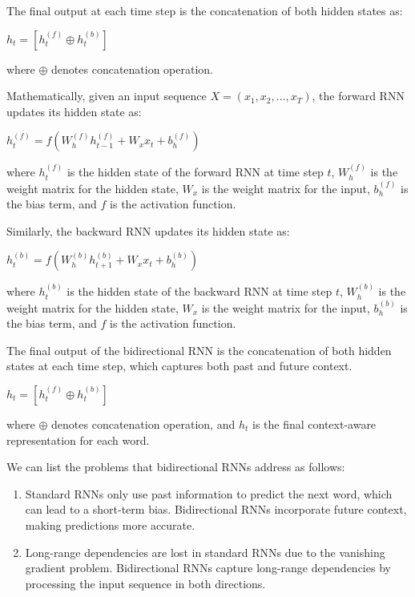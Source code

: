 \documentclass[10pt]{article}
\begin{document}
\begin{description}
The final output at each time step is the concatenation of both hidden states as:

\begin{center}
    $h_t = [h_t^{(f)} \oplus h_t^{(b)}]$
\end{center}

where $\oplus$ denotes concatenation operation.

Mathematically, given an input sequence $X = (x_1, x_2, ..., x_T)$, the forward RNN updates its hidden state as:

\begin{center}
    $h_t^{(f)} = f(W_{h}^{(f)}h_{t-1}^{(f)} + W_{x}x_t + b_h^{(f)})$
\end{center}

where $h_t^{(f)}$ is the hidden state of the forward RNN at time step $t$, $W_{h}^{(f)}$ is the weight matrix for the hidden state, $W_{x}$ is the weight matrix for the input, $b_h^{(f)}$ is the bias term, and $f$ is the activation function.

Similarly, the backward RNN updates its hidden state as:

\begin{center}
    $h_t^{(b)} = f(W_{h}^{(b)}h_{t+1}^{(b)} + W_{x}x_t + b_h^{(b)})$
\end{center}

where $h_t^{(b)}$ is the hidden state of the backward RNN at time step $t$, $W_{h}^{(b)}$ is the weight matrix for the hidden state, $W_{x}$ is the weight matrix for the input, $b_h^{(b)}$ is the bias term, and $f$ is the activation function.

The final output of the bidirectional RNN is the concatenation of both hidden states at each time step, which captures both past and future context.

\begin{center}
    $h_t = [h_t^{(f)} \oplus h_t^{(b)}]$
\end{center}

where $\oplus$ denotes concatenation operation, and $h_t$ is the final context-aware representation for each word.

We can list the problems that bidirectional RNNs address as follows:

\begin{enumerate}
    \item Standard RNNs only use past information to predict the next word, which can lead to a short-term bias.
    Bidirectional RNNs incorporate future context, making predictions more accurate.
    \item Long-range dependencies are lost in standard RNNs due to the vanishing gradient problem.
    Bidirectional RNNs capture long-range dependencies by processing the input sequence in both directions.
\end{enumerate}


\end{description}
\end{document}
